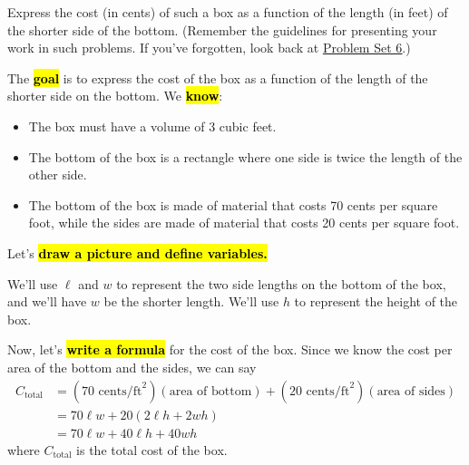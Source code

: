\documentclass{article}
\makeatletter
\let\@href=\href
\renewcommand{\href}[2]{\@href{#1}{\ul{#2}}}
\makeatother
\begin{document}
\begin{enumerate}
\begin{enumerate}
    \begin{problem}[\nstretch{2}]
      Express the cost (in cents) of such a box as a function of the length (in feet) of the shorter side of the bottom. (Remember the guidelines for presenting your work in such problems. If you've forgotten, look back at \href{https://people.math.harvard.edu/~jjchen/mathma/docs/homework/PS06.html}{Problem Set 6}.) 
    \end{problem}

    \begin{solution}
      The \hl{\textbf{goal}} is to express the cost of the box as a function of the length of the shorter side on the bottom.
      We \hl{\textbf{know}}:
      \begin{itemize}[nosep]
        \item The box must have a volume of 3 cubic feet.
        \item The bottom of the box is a rectangle where one side is twice the length of the other side.
        \item The bottom of the box is made of material that costs 70 cents per square foot, while the sides are made of
        material that costs 20 cents per square foot.
      \end{itemize}

      Let's \hl{\textbf{draw a picture and define variables.}}
      

      We'll use $\ell$ and $w$ to represent the two side lengths on the bottom of the box, and we'll have $w$ be the shorter
      length. We'll use $h$ to represent the height of the box.

      Now, let's \hl{\textbf{write a formula}} for the cost of the box. Since we know the cost per area of the bottom and the
      sides, we can say
      \begin{align*}
      C_\text{total} &= (70\text{ cents/ft}^2)(\text{area of bottom}) + (20\text{ cents/ft}^2)(\text{area of sides}) \\
      &= 70\ell w + 20(2\ell h + 2 wh) \\
      &= 70\ell w + 40\ell h + 40 wh
      \end{align*}
      where $C_\text{total}$ is the total cost of the box.


\end{solution}
\end{enumerate}
\end{enumerate}
\end{document}
